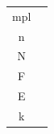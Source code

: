 \documentclass{article}
\begin{document}
\newpage



\begin{tabular}{c|c}
  mpl  &  \\
  n   &  \\
  N   &  \\
  F   &  \\
  E   &  \\
  k   & 
\end{tabular} 


 
\end{document}
